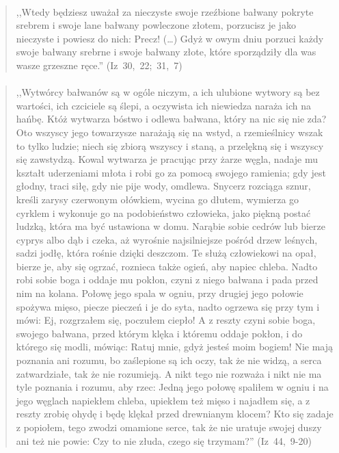 \documentclass[10pt,a4paper,oneside]{article}
\begin{document}
\paragraph{}
\begin{quote}
,,Wtedy będziesz uważał za nieczyste swoje rzeźbione bałwany pokryte srebrem i swoje lane bałwany powleczone złotem, porzucisz je jako nieczyste i powiesz do nich: Precz! (\ldots) Gdyż w owym dniu porzuci każdy swoje bałwany srebrne i swoje bałwany złote, które sporządziły dla was wasze grzeszne ręce.'' \mbox{(Iz 30, 22; 31, 7)}
\end{quote}
\paragraph{}
\begin{quote}
,,Wytwórcy bałwanów są w ogóle niczym, a ich ulubione wytwory są bez wartości, ich czciciele są ślepi, a oczywista ich niewiedza naraża ich na hańbę. Któż wytwarza bóstwo i odlewa bałwana, który na nic się nie zda? Oto wszyscy jego towarzysze narażają się na wstyd, a rzemieślnicy wszak to tylko ludzie; niech się zbiorą wszyscy i staną, a przelękną się i wszyscy się zawstydzą. Kowal wytwarza je pracując przy żarze węgla, nadaje mu kształt uderzeniami młota i robi go za pomocą swojego ramienia; gdy jest głodny, traci siłę, gdy nie pije wody, omdlewa. Snycerz rozciąga sznur, kreśli zarysy czerwonym ołówkiem, wycina go dłutem, wymierza go cyrklem i wykonuje go na podobieństwo człowieka, jako piękną postać ludzką, która ma być ustawiona w domu. Narąbie sobie cedrów lub bierze cyprys albo dąb i czeka, aż wyrośnie najsilniejsze pośród drzew leśnych, sadzi jodłę, która rośnie dzięki deszczom. Te służą człowiekowi na opał, bierze je, aby się ogrzać, roznieca także ogień, aby napiec chleba. Nadto robi sobie boga i oddaje mu pokłon, czyni z niego bałwana i pada przed nim na kolana. Połowę jego spala w ogniu, przy drugiej jego połowie spożywa mięso, piecze pieczeń i je do syta, nadto ogrzewa się przy tym i mówi: Ej, rozgrzałem się, poczułem ciepło! A z reszty czyni sobie boga, swojego bałwana, przed którym klęka i któremu oddaje pokłon, i do którego się modli, mówiąc: Ratuj mnie, gdyż jesteś moim bogiem! Nie mają poznania ani rozumu, bo zaślepione są ich oczy, tak że nie widzą, a serca zatwardziałe, tak że nie rozumieją. A nikt tego nie rozważa i nikt nie ma tyle poznania i rozumu, aby rzec: Jedną jego połowę spaliłem w ogniu i na jego węglach napiekłem chleba, upiekłem też mięso i najadłem się, a z reszty zrobię ohydę i będę klękał przed drewnianym klocem? Kto się zadaje z popiołem, tego zwodzi omamione serce, tak że nie uratuje swojej duszy ani też nie powie: Czy to nie złuda, czego się trzymam?'' \mbox{(Iz 44, 9-20)}
\end{quote}
\end{document}
